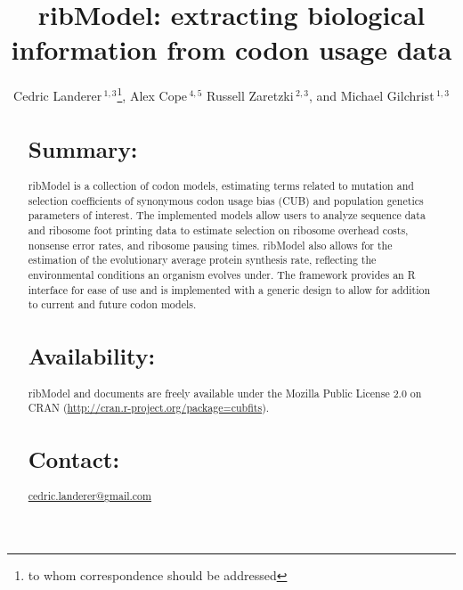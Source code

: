 \documentclass{bioinfo}
\newcommand{\pkg}[1]{{\fontseries{b}\selectfont #1}}
\newcommand{\package}{ribModel } %
\begin{document}

\title[ribModel]{ribModel: extracting biological information from codon usage data}
\author[
Landerer \textit{et~al}]{Cedric Landerer\,$^{1,3}$\footnote{
to whom correspondence should be addressed
},
Alex Cope\,$^{4,5}$
Russell Zaretzki\,$^{2,3}$, and
Michael Gilchrist\,$^{1,3}$
}
\address{$^{1}$
Department of Ecology and Evolutionary Biology,
$^{2}$Department of Statistics, Operations, and Management Science, and
$^{3}$National Institute for Mathematical and Biological Synthesis,
University of Tennessee, Knoxville, TN, USA,
$^{4}$Genome Science and Technology, University of Tennessee, Knoxville, TN, USA
$^{5}$Oak Ridge National Labratory, Oak Ridge, TN, USA} 


\maketitle

\begin{abstract}

\section{Summary:}
\pkg{\package} is a collection of codon models, estimating terms related to mutation and selection coefficients of synonymous codon usage bias (CUB) and population genetics parameters of interest. 
The implemented models allow users to analyze sequence data and ribosome foot printing data to estimate selection on ribosome overhead costs, nonsense error rates, and ribosome pausing times. 
\package also allows for the estimation of the evolutionary average protein synthesis rate, reflecting the environmental conditions an organism evolves under. 
The framework provides an R interface for ease of use and is implemented with a generic design to allow for addition to current and future codon models.

\section{Availability:}
\pkg{\package} and documents are freely available under the Mozilla Public License 2.0
on CRAN (\url{http://cran.r-project.org/package=cubfits}).

\section{Contact:} \href{cedric.landerer@gmail.com}{cedric.landerer@gmail.com}
\end{abstract}
\end{document}

